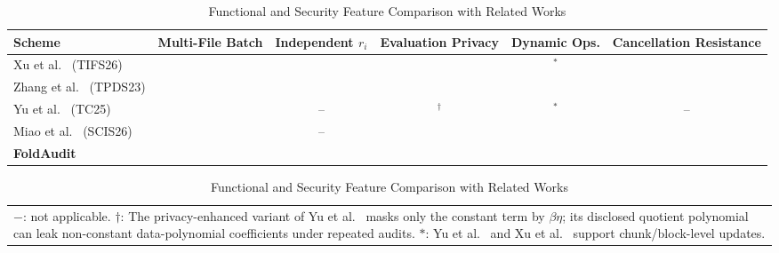 \documentclass[lettersize,journal]{IEEEtran}
\newcommand{\cmark}{\ding{51}}%
\newcommand{\xmark}{\ding{55}}%
\begin{document}
\begin{table}[!t]
  \centering
  \caption{Functional and Security Feature Comparison with Related Works}
  \label{tab:feature_comparison_simplified}
  \renewcommand{\arraystretch}{1.12}
  \begin{tabular}{l|c|c|c|c|c}
    \hline
    \textbf{Scheme} & \textbf{Multi-File Batch} & \textbf{Independent $r_i$} & \textbf{Evaluation Privacy} & \textbf{Dynamic Ops.} & \textbf{Cancellation Resistance} \\
    \hline
    Xu et al.~\cite{XuTIFS26} (TIFS26) & \cmark & \xmark & \xmark & \cmark$^\ast$ & \xmark \\
    Zhang et al.~\cite{ZhangTPDS23} (TPDS23) & \cmark & \cmark & \xmark & \xmark & \xmark \\
    Yu et al.~\cite{YuTC25} (TC25) & \xmark & -- & \xmark$^\dag$ & \cmark$^\ast$ & -- \\
    Miao et al.~\cite{MiaoSCIS2026} (SCIS26) & \cmark & -- & \cmark & \cmark & \xmark \\
    \textbf{FoldAudit} & \cmark & \cmark & \cmark & \cmark & \cmark \\
    \hline
  \end{tabular}
  \vspace{0.5mm}
  \footnotesize
  \begin{tabular}{p{}}
    $-$: not applicable.
    $\dag$: The privacy-enhanced variant of Yu et al.~\cite{YuTC25} masks only the constant term by $\beta\eta$; its disclosed quotient polynomial can leak non-constant data-polynomial coefficients under repeated audits.
    $\ast$: Yu et al.~\cite{YuTC25} and Xu et al.~\cite{XuTIFS26} support chunk/block-level updates.
  \end{tabular}
\end{table}
\end{document}
